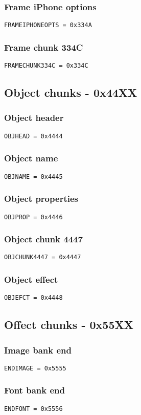 \documentclass{article}
\begin{document}
\subsubsection{Frame iPhone options}
\verb|FRAMEIPHONEOPTS = 0x334A|

\subsubsection{Frame chunk 334C}
\verb|FRAMECHUNK334C = 0x334C|

\subsection{Object chunks - 0x44XX}

\subsubsection{Object header}
\verb|OBJHEAD = 0x4444|

\subsubsection{Object name}
\verb|OBJNAME = 0x4445|

\subsubsection{Object properties}
\verb|OBJPROP = 0x4446|

\subsubsection{Object chunk 4447}
\verb|OBJCHUNK4447 = 0x4447|

\subsubsection{Object effect}
\verb|OBJEFCT = 0x4448|

\subsection{Offect chunks - 0x55XX}
\label{subsec:offset-chunks}

\subsubsection{Image bank end}
\verb|ENDIMAGE = 0x5555|

\subsubsection{Font bank end}
\verb|ENDFONT = 0x5556|
\end{document}
